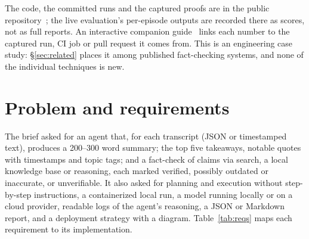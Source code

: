 \documentclass[11pt]{article}
\begin{document}
The code, the committed runs and the captured proofs are in the public repository~\citep{repo}; the live evaluation's per-episode outputs are recorded there as scores, not as full reports. An interactive companion guide~\citep{guide} links each number to the captured run, CI job or pull request it comes from. This is an engineering case study: \S\ref{sec:related} places it among published fact-checking systems, and none of the individual techniques is new.

\section{Problem and requirements}\label{sec:problem}

The brief asked for an agent that, for each transcript (JSON or timestamped text), produces a 200--300 word summary; the top five takeaways, notable quotes with timestamps and topic tags; and a fact-check of claims via search, a local knowledge base or reasoning, each marked verified, possibly outdated or inaccurate, or unverifiable. It also asked for planning and execution without step-by-step instructions, a containerized local run, a model running locally or on a cloud provider, readable logs of the agent's reasoning, a JSON or Markdown report, and a deployment strategy with a diagram. Table~\ref{tab:reqs} maps each requirement to its implementation.
\end{document}
